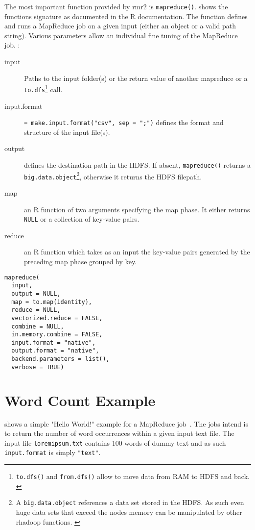 The most important function provided by rmr2 is \lstinline!mapreduce()!.  shows the functions signature as documented in the R documentation. The function defines and runs a MapReduce job on a given input (either an object or a valid path string). Various parameters allow an individual fine tuning of the MapReduce job. \Eg:

\begin{description}
\item[input] Paths to the input folder(s) or the return value of another mapreduce or a \lstinline!to.dfs!\footnote{\texttt{to.dfs()} and \texttt{from.dfs()} allow to move data from RAM to HDFS and back.  \cite[R help of rmr2,][]{rhadoop}} call.
\item[input.format] \lstinline!= make.input.format("csv", sep = ";")! defines the format and structure of the input file(s).
\item[output] defines the destination path in the HDFS. If absent, \lstinline!mapreduce()! returns a \texttt{big.data.object}\footnote{A \texttt{big.data.object} references a data set stored in the HDFS. As such even huge data sets that exceed the nodes memory can be manipulated by other rhadoop functions. \cite[R help of rmr2,][]{rhadoop}}, otherwise it returns the \ac{HDFS} filepath.
\item[map] an R function of two arguments specifying the map phase. It either returns \lstinline!NULL! or a collection of key-value pairs.
\item[reduce] an R function which takes as an input the key-value pairs generated by the preceding map phase grouped by key.
\end{description}

\begin{lstlisting}[breaklines=true, caption=function signature of \lstinline!mapreduce()! as described in the rmr2 help (\lstinline!?mapreduce!)., escapechar=|, label={lst:structMapReduce}]
mapreduce(
  input,
  output = NULL,
  map = to.map(identity),
  reduce = NULL,
  vectorized.reduce = FALSE,
  combine = NULL,
  in.memory.combine = FALSE,
  input.format = "native",
  output.format = "native",
  backend.parameters = list(),
  verbose = TRUE) 
\end{lstlisting}


\section{Word Count Example}\label{chap:helloWorld}
 shows a simple "Hello World!" example for a MapReduce job~\cite{usingRAndHadoop}. The jobs intend is to return the number of word occurrences within a given input text file. The input file \texttt{loremipsum.txt} contains 100 words of dummy text and as such \lstinline!input.format! is simply \lstinline!"text"!.

